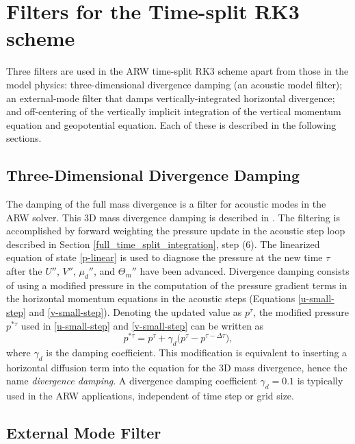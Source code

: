 %
%

\section{Filters for the Time-split RK3 scheme}

Three filters are used in the ARW time-split RK3
scheme apart from those in the model physics: three-dimensional
divergence damping (an acoustic model filter); an external-mode filter
that damps vertically-integrated horizontal divergence; and off-centering
of the vertically implicit integration of the vertical momentum
equation and geopotential equation.  Each of these is described in the
following sections.

\subsection{Three-Dimensional Divergence Damping}

The damping of the full mass divergence is a filter for acoustic
modes in the ARW solver.  This 3D mass divergence damping is described
in \citet{skamarock92}.  The filtering is accomplished by
forward weighting the pressure update in the acoustic step loop
described in Section \ref{full_time_split_integration}, step (6).  The linearized equation of
state \eqref{p-linear} is used to diagnose the pressure at the new time $\tau$
after the $U''$, $V''$, $\mu_d''$, and $\Theta_m''$ have
been advanced.  Divergence damping consists of using a modified pressure
in the computation of the pressure gradient terms in the horizontal
momentum equations in the acoustic steps (Equations \eqref{u-small-step}
and \eqref{v-small-step}).  Denoting the updated value as $p^\tau$, 
the modified pressure $p^{*\tau}$ used in \eqref{u-small-step}
and \eqref{v-small-step}
can be written as
%
\begin{equation}
p^{*\tau} = 
{p}^{\tau} + \gamma_d \bigl(
{p}^{\tau} -
{p}^{\tau - \Delta \tau}
\bigr),
\end{equation}
%
\noindent
where $\gamma_d$ is the damping coefficient.  
This modification is equivalent to inserting a horizontal 
diffusion term into the equation for the 3D mass divergence,
hence the name {\em divergence damping}.
A divergence damping coefficient $\gamma_d = 0.1$ is
typically used in the ARW
applications, independent of time step or grid size.

\subsection{External Mode Filter}

